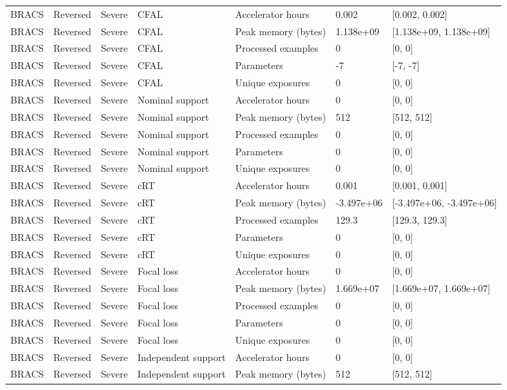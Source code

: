 \begin{longtable}{lllllll}
BRACS & Reversed & Severe & CFAL & Accelerator hours & 0.002 & [0.002, 0.002] \\
BRACS & Reversed & Severe & CFAL & Peak memory (bytes) & 1.138e+09 & [1.138e+09, 1.138e+09] \\
BRACS & Reversed & Severe & CFAL & Processed examples & 0 & [0, 0] \\
BRACS & Reversed & Severe & CFAL & Parameters & -7 & [-7, -7] \\
BRACS & Reversed & Severe & CFAL & Unique exposures & 0 & [0, 0] \\
BRACS & Reversed & Severe & Nominal support & Accelerator hours & 0 & [0, 0] \\
BRACS & Reversed & Severe & Nominal support & Peak memory (bytes) & 512 & [512, 512] \\
BRACS & Reversed & Severe & Nominal support & Processed examples & 0 & [0, 0] \\
BRACS & Reversed & Severe & Nominal support & Parameters & 0 & [0, 0] \\
BRACS & Reversed & Severe & Nominal support & Unique exposures & 0 & [0, 0] \\
BRACS & Reversed & Severe & cRT & Accelerator hours & 0.001 & [0.001, 0.001] \\
BRACS & Reversed & Severe & cRT & Peak memory (bytes) & -3.497e+06 & [-3.497e+06, -3.497e+06] \\
BRACS & Reversed & Severe & cRT & Processed examples & 129.3 & [129.3, 129.3] \\
BRACS & Reversed & Severe & cRT & Parameters & 0 & [0, 0] \\
BRACS & Reversed & Severe & cRT & Unique exposures & 0 & [0, 0] \\
BRACS & Reversed & Severe & Focal loss & Accelerator hours & 0 & [0, 0] \\
BRACS & Reversed & Severe & Focal loss & Peak memory (bytes) & 1.669e+07 & [1.669e+07, 1.669e+07] \\
BRACS & Reversed & Severe & Focal loss & Processed examples & 0 & [0, 0] \\
BRACS & Reversed & Severe & Focal loss & Parameters & 0 & [0, 0] \\
BRACS & Reversed & Severe & Focal loss & Unique exposures & 0 & [0, 0] \\
BRACS & Reversed & Severe & Independent support & Accelerator hours & 0 & [0, 0] \\
BRACS & Reversed & Severe & Independent support & Peak memory (bytes) & 512 & [512, 512] \\

\end{longtable}
